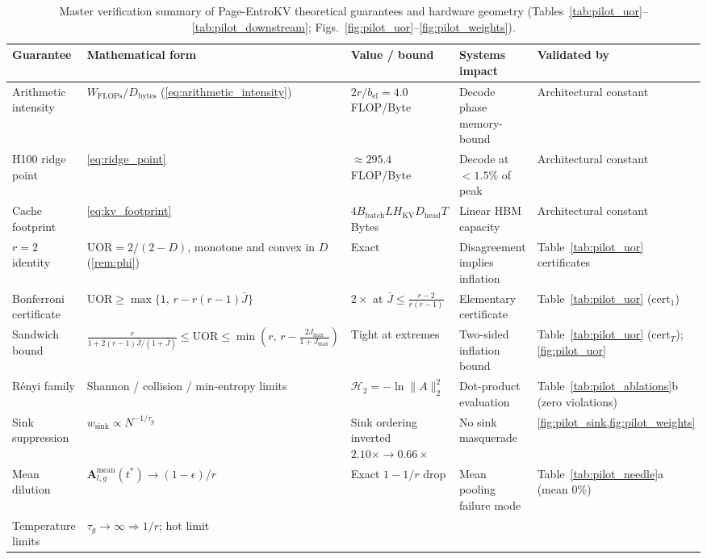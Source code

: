 \documentclass[final,5p,times,twocolumn]{elsarticle}
\theoremstyle{definition}
\theoremstyle{remark}
\newcommand{\method}{Page-EntroKV}
\newcommand{\HKV}{H_{\mathrm{KV}}}
\newcommand{\Dhead}{D_{\mathrm{head}}}
\newcommand{\Bbatch}{B_{\mathrm{batch}}}
\newcommand{\AttnMean}[2]{\mathbf{A}^{\mathrm{mean}}_{#1,#2}}
\newcommand{\UOR}{\mathrm{UOR}}
\begin{document}
\begin{table}[t]
\centering
\small
\caption{Master verification summary of \method{} theoretical
  guarantees and hardware geometry (Tables~\ref{tab:pilot_uor}--\ref{tab:pilot_downstream};
  Figs.~\ref{fig:pilot_uor}--\ref{fig:pilot_weights}).}
\label{tab:master_verification_summary}
\begin{tabular}{@{}p{} p{} p{} p{} p{}@{}}
\toprule
\textbf{Guarantee} & \textbf{Mathematical form} &
\textbf{Value / bound} & \textbf{Systems impact} &
\textbf{Validated by} \\
\midrule
Arithmetic intensity & $W_{\mathrm{FLOPs}}/D_{\mathrm{bytes}}$  (\cref{eq:arithmetic_intensity}) & $2r/b_{\mathrm{el}} = 4.0$  FLOP/Byte & Decode phase memory-bound & Architectural constant \\
H100 ridge point & \cref{eq:ridge_point} & $\approx 295.4$ FLOP/Byte &
Decode at $<1.5\%$ of peak & Architectural constant \\
Cache footprint & \cref{eq:kv_footprint} & $4\Bbatch L\HKV\Dhead T$  Bytes & Linear HBM capacity & Architectural constant \\
 $r=2$ identity & $\UOR = 2/(2-D)$, monotone and convex in $D$  (\cref{rem:phi}) & Exact & Disagreement implies inflation &
 Table~\ref{tab:pilot_uor} certificates \\
Bonferroni certificate & $\UOR \ge \max\{1,\, r - r(r-1)\bar{J}\}$ &
 $2\times$ at $\bar{J}\le\frac{r-2}{r(r-1)}$ & Elementary certificate &
 Table~\ref{tab:pilot_uor} ($\mathrm{cert}_1$) \\
Sandwich bound & $\frac{r}{1+2(r-1)\bar J/(1+\bar J)} \le \UOR \le
 \min(r,\, r - \frac{2J_{\max}}{1+J_{\max}})$ & Tight at extremes &
 Two-sided inflation bound & Table~\ref{tab:pilot_uor}
 ($\mathrm{cert}_T$); \cref{fig:pilot_uor} \\
R\'enyi family & Shannon / collision / min-entropy limits &
 $\mathcal{H}_2=-\ln\|A\|_2^2$ & Dot-product evaluation &
 Table~\ref{tab:pilot_ablations}b (zero violations) \\
Sink suppression & $w_{\mathrm{sink}} \propto N^{-1/\tau_g}$ &
 Sink ordering inverted $2.10\times \to 0.66\times$ & No sink
 masquerade & \cref{fig:pilot_sink,fig:pilot_weights} \\
Mean dilution & $\AttnMean{l}{g}(t^{*}) \to (1-\epsilon)/r$ & Exact
 $1-1/r$ drop & Mean pooling failure mode &
 Table~\ref{tab:pilot_needle}a (mean $0\%$) \\
Temperature limits & $\tau_g \to \infty \Rightarrow 1/r$; hot limit

\end{tabular}
\end{table}
\end{document}
